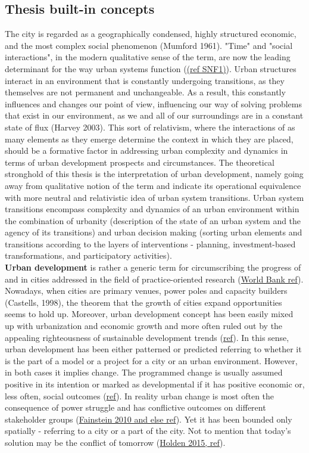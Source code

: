 \documentclass[11pt]{report}
\begin{document}
\subsection{Thesis built-in concepts}
The city is regarded as a geographically condensed, highly structured economic, and the most complex social phenomenon (Mumford 1961). "Time" and "social interactions", in the modern qualitative sense of the term, are now the leading determinant for the way urban systems function (\href{ref}{(ref SNF1)}). Urban structures interact in an environment that is constantly undergoing transitions, as they themselves are not permanent and unchangeable. As a result, this constantly influences and changes our point of view, influencing our way of solving problems that exist in our environment, as we and all of our surroundings are in a constant state of flux (Harvey 2003). This sort of relativism, where the interactions of as many elements as they emerge determine the context in which they are placed, should be a formative factor in addressing urban complexity and dynamics in terms of urban development prospects and circumstances. The theoretical stronghold of this thesis is the interpretation of urban development, namely going away from qualitative notion of the term and indicate its operational equivalence with more neutral and relativistic idea of urban system transitions. Urban system transitions encompass complexity and dynamics of an urban environment within the combination of urbanity (description of the state of an urban system and the agency of its transitions) and urban decision making (sorting urban elements and transitions according to the layers of interventions - planning, investment-based transformations, and participatory activities).
\\ 
\textbf{Urban development} is rather a generic term for circumscribing the progress of and in cities addressed in the  field of practice-oriented research (\href{ref}{World Bank ref}). Nowadays, when cities are primary venues, power poles and capacity builders (Castells, 1998), the theorem that the growth of cities expand opportunities seems to hold up. Moreover, urban development concept has been easily mixed up with urbanization and economic growth and more often ruled out by the appealing righteousness of sustainable development trends (\href{ref}{ref}).  In this sense, urban development has been either patterned or predicted referring to whether it is the part of a model or a project for a city or an urban environment. However, in both cases it implies change. The programmed change is usually assumed positive in its intention or marked as developmental if it has positive economic or, less often, social outcomes (\href{ref}{ref}). In reality urban change is most often the consequence of power struggle and has conflictive outcomes on different stakeholder groups (\href{ref}{Fainstein 2010 and else ref}). Yet it has been bounded only spatially - referring to a city or a part of the city. Not to mention that today's solution may be the conflict of tomorrow (\href{ref}{Holden 2015, ref}).
\end{document}

